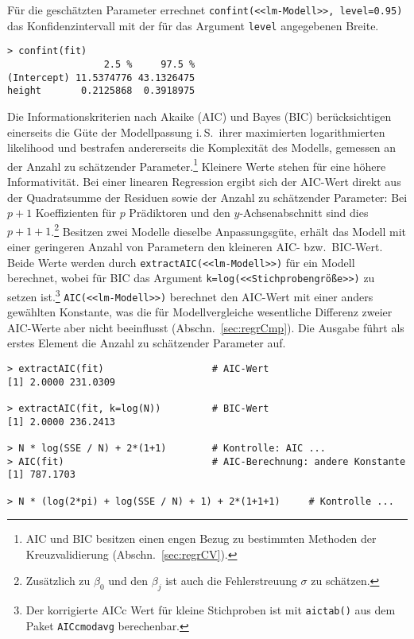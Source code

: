 Für die geschätzten Parameter errechnet \lstinline!confint(<<lm-Modell>>, level=0.95)! das Konfidenzintervall mit der für das Argument \lstinline!level! angegebenen Breite.
\begin{lstlisting}
> confint(fit)
                 2.5 %     97.5 %
(Intercept) 11.5374776 43.1326475
height       0.2125868  0.3918975
\end{lstlisting}

Die Informationskriterien nach Akaike (AIC) und Bayes (BIC) berücksichtigen einerseits die Güte der Modellpassung i.\,S.\ ihrer maximierten logarithmierten likelihood und bestrafen andererseits die Komplexität des Modells, gemessen an der Anzahl zu schätzender Parameter.\footnote{AIC und BIC besitzen einen engen Bezug zu bestimmten Methoden der Kreuzvalidierung (Abschn.\ \ref{sec:regrCV}).} Kleinere Werte stehen für eine höhere Informativität. Bei einer linearen Regression ergibt sich der AIC-Wert direkt aus der Quadratsumme der Residuen sowie der Anzahl zu schätzender Parameter: Bei $p+1$ Koeffizienten für $p$ Prädiktoren und den $y$-Achsenabschnitt sind dies $p+1+1$.\footnote{Zusätzlich zu $\beta_{0}$ und den $\beta_{j}$ ist auch die Fehlerstreuung $\sigma$ zu schätzen.} Besitzen zwei Modelle dieselbe Anpassungsgüte, erhält das Modell mit einer geringeren Anzahl von Parametern den kleineren AIC- bzw.\ BIC-Wert. Beide Werte werden durch \lstinline!extractAIC(<<lm-Modell>>)! für ein Modell berechnet, wobei für BIC das Argument \lstinline!k=log(<<Stichprobengröße>>)! zu setzen ist.\footnote{Der korrigierte AICc Wert für kleine Stichproben ist mit  \lstinline!aictab()! aus dem Paket  \lstinline!AICcmodavg! \cite{Mazerolle2013} berechenbar.} \lstinline!AIC(<<lm-Modell>>)! berechnet den AIC-Wert mit einer anders gewählten Konstante, was die für Modellvergleiche wesentliche Differenz zweier AIC-Werte aber nicht beeinflusst (Abschn.\ \ref{sec:regrCmp}). Die Ausgabe führt als erstes Element die Anzahl zu schätzender Parameter auf.
\begin{lstlisting}
> extractAIC(fit)                   # AIC-Wert
[1] 2.0000 231.0309

> extractAIC(fit, k=log(N))         # BIC-Wert
[1] 2.0000 236.2413

> N * log(SSE / N) + 2*(1+1)        # Kontrolle: AIC ...
> AIC(fit)                          # AIC-Berechnung: andere Konstante
[1] 787.1703

> N * (log(2*pi) + log(SSE / N) + 1) + 2*(1+1+1)     # Kontrolle ...
\end{lstlisting}

